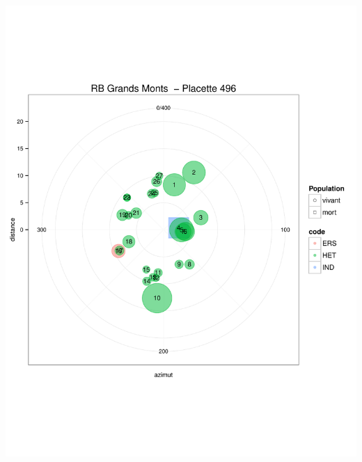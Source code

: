 \documentclass[a4paper]{book}\usepackage[]{graphicx}\usepackage[]{color}
\makeatletter
\def\maxwidth{ %
  \ifdim\Gin@nat@width>\linewidth
    \linewidth
  \else
    \Gin@nat@width
  \fi
}
\newenvironment{knitrout}{}{} %
\makeatother
\begin{document}
\begin{knitrout}
{\centering \includegraphics[width=\maxwidth]{Figures/PlanArbres-57} 

}



\end{knitrout}
\end{document}
